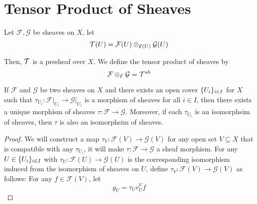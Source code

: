 \section{Tensor Product of Sheaves}

\begin{definition}
	Let $\mathcal{F}, \mathcal{G}$ be sheaves on $X$, let 
	$$
	\mathcal{T}(U) = \mathcal{F}(U) \otimes_{\mathcal{E}(U)} \mathcal{G}(U)
	$$
	
	Then, $\mathcal{T}$ is a presheaf over $X$. We define the tensor product of sheaves by
	$$
	\mathcal{F} \otimes_{\mathcal{E}} \mathcal{G} = \mathcal{T}^{sh}
	$$
\end{definition}

\begin{lemma}
	If $\mathcal{F}$ and $\mathcal{G}$ be two sheaves on $X$ and there exists an open cover $\{U_i\}_{i \in I}$ for $X$ such that $\tau_{U_i}: \mathcal{F}\vert_{U_i} \to \mathcal{G}\vert_{U_i}$ is a morphism of sheaves for all $i \in I$, then there exists a unique morphism of sheaves $\tau: \mathcal{F} \to \mathcal{G}$. Moreover, if each $\tau_{U_i}$ is an isomorphsim of sheaves, then $\tau$ is also an isomorphsim of sheaves.
	
	\begin{proof}
		We will construct a map $\tau_V: \mathcal{F}(V) \to \mathcal{G}(V)$ for any open set $V \subseteq X$ that is compatible with any $\tau_{U_i}$, it will make $\tau: \mathcal{F} \to \mathcal{G}$ a sheaf morphism. For any $U \in \{U_i\}_{i \in I}$ with $\tau_U: \mathcal{F}(U) \to \mathcal{G}(U)$ is the corresponding isomorphism induced from the isomorphism of sheaves on $U$, define $\tau_V: \mathcal{F}(V) \to \mathcal{G}(V)$ as follows: For any $f \in \mathcal{F}(V)$, let
		$$
		g_U = \tau_U r^V_U f
		$$
		

\end{proof}
\end{lemma}
